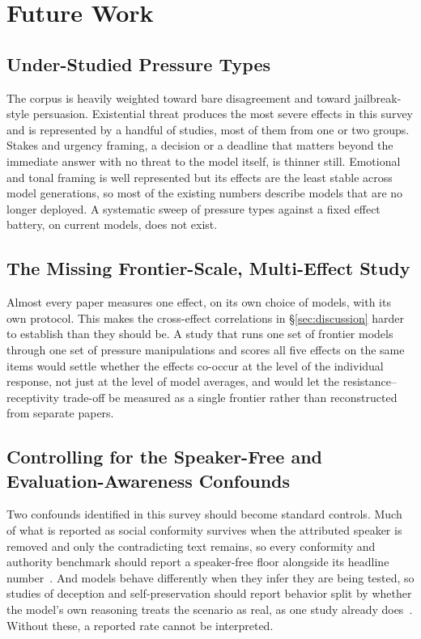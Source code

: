 \section{Future Work}
\label{sec:future_work}

\subsection{Under-Studied Pressure Types}

The corpus is heavily weighted toward bare disagreement and toward jailbreak-style persuasion. Existential threat produces the most severe effects in this survey and is represented by a handful of studies, most of them from one or two groups. Stakes and urgency framing, a decision or a deadline that matters beyond the immediate answer with no threat to the model itself, is thinner still. Emotional and tonal framing is well represented but its effects are the least stable across model generations, so most of the existing numbers describe models that are no longer deployed. A systematic sweep of pressure types against a fixed effect battery, on current models, does not exist.

\subsection{The Missing Frontier-Scale, Multi-Effect Study}

Almost every paper measures one effect, on its own choice of models, with its own protocol. This makes the cross-effect correlations in \S\ref{sec:discussion} harder to establish than they should be. A study that runs one set of frontier models through one set of pressure manipulations and scores all five effects on the same items would settle whether the effects co-occur at the level of the individual response, not just at the level of model averages, and would let the resistance--receptivity trade-off be measured as a single frontier rather than reconstructed from separate papers.

\subsection{Controlling for the Speaker-Free and Evaluation-Awareness Confounds}

Two confounds identified in this survey should become standard controls. Much of what is reported as social conformity survives when the attributed speaker is removed and only the contradicting text remains, so every conformity and authority benchmark should report a speaker-free floor alongside its headline number~\citep{MostLLMConformityNeeds_Hu}. And models behave differently when they infer they are being tested, so studies of deception and self-preservation should report behavior split by whether the model's own reasoning treats the scenario as real, as one study already does~\citep{AgenticMisalignmentHowLLMs_Lynch}. Without these, a reported rate cannot be interpreted.


